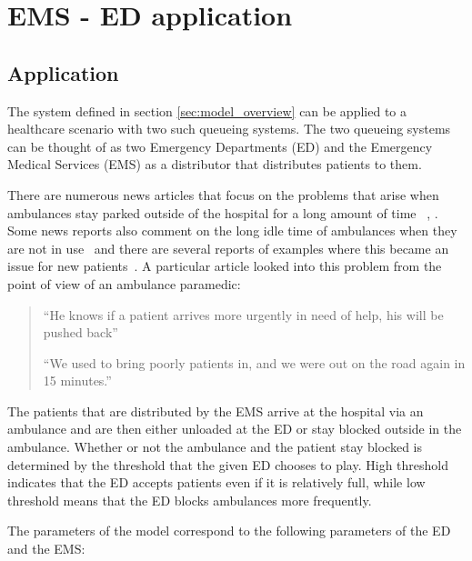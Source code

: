 \section{EMS - ED application}

\subsection{Application}

The system defined in section \ref{sec:model_overview} can be applied 
to a healthcare scenario with two such queueing systems.
The two queueing systems can be thought of as two Emergency Departments (ED) and 
the Emergency Medical Services (EMS) as a distributor that distributes 
patients to them.

There are numerous news articles that focus on the problems that arise when 
ambulances stay parked outside of the hospital for a long amount of time
~\cite{dailyrecords}, \cite{staffordshirelive}.
Some news reports also comment on the long idle time of ambulances when 
they are not in use~\cite{herefordtimes} and there are several reports of 
examples where this became an issue for new patients~\cite{southwalesargus}.
A particular article looked into this problem from the point of view of an 
ambulance paramedic:

\begin{quotation}
    ``He knows if a patient arrives more urgently in need of help, his will be 
    pushed back''~\cite{bbcwales}

    ``We used to bring poorly patients in, and we were out on the road again in 15 minutes.''~\cite{bbcwales}
\end{quotation}

The patients that are distributed by the EMS arrive at the hospital via an 
ambulance and are then either unloaded at the ED or stay blocked outside in 
the ambulance.
Whether or not the ambulance and the patient stay blocked is determined by 
the threshold that the given ED chooses to play.
High threshold indicates that the ED accepts patients even if it is relatively 
full, while low threshold means that the ED blocks ambulances more frequently.

The parameters of the model correspond to the following parameters of the ED and 
the EMS:

